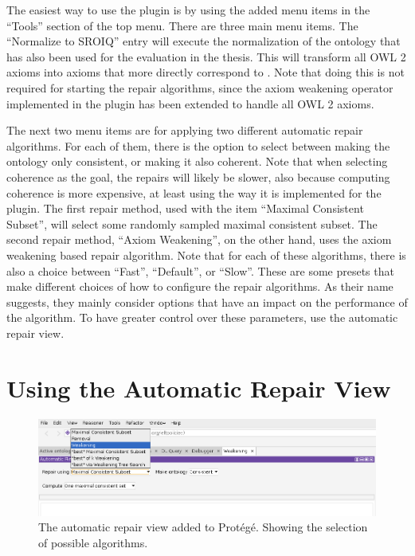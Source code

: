The easiest way to use the plugin is by using the added menu items in the ``Tools'' section of the top menu. There are three main menu items. The ``Normalize to SROIQ'' entry will execute the normalization of the ontology that has also been used for the evaluation in the thesis. This will transform all OWL 2 axioms into axioms that more directly correspond to \SROIQ. Note that doing this is not required for starting the repair algorithms, since the axiom weakening operator implemented in the plugin has been extended to handle all OWL 2 axioms.

The next two menu items are for applying two different automatic repair algorithms. For each of them, there is the option to select between making the ontology only consistent, or making it also coherent. Note that when selecting coherence as the goal, the repairs will likely be slower, also because computing coherence is more expensive, at least using the way it is implemented for the plugin. The first repair method, used with the item ``Maximal Consistent Subset'', will select some randomly sampled maximal consistent subset. The second repair method, ``Axiom Weakening'', on the other hand, uses the axiom weakening based repair algorithm. Note that for each of these algorithms, there is also a choice between ``Fast'', ``Default'', or ``Slow''. These are some presets that make different choices of how to configure the repair algorithms. As their name suggests, they mainly consider options that have an impact on the performance of the algorithm. To have greater control over these parameters, use the automatic repair view.

\section{Using the Automatic Repair View}

\begin{figure}[htbp]
  \centering
  \includegraphics[width=\textwidth]{resources/protege-guide-algorithms.png}
  \caption{The automatic repair view added to Protégé. Showing the selection of possible algorithms.}
\end{figure}

